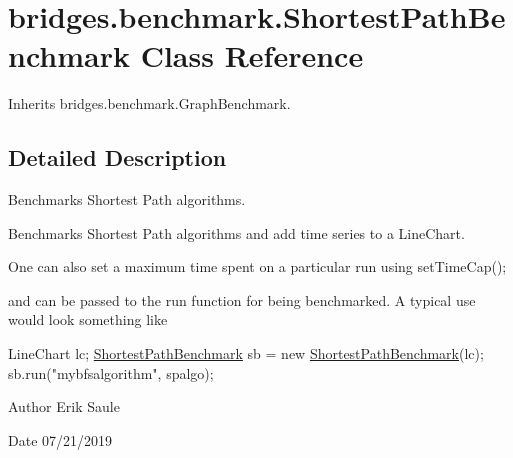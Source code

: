 \hypertarget{classbridges_1_1benchmark_1_1_shortest_path_benchmark}{}\section{bridges.\+benchmark.\+Shortest\+Path\+Benchmark Class Reference}
\label{classbridges_1_1benchmark_1_1_shortest_path_benchmark}


Inherits bridges.\+benchmark.\+Graph\+Benchmark.



\subsection{Detailed Description}
Benchmarks Shortest Path algorithms. 

Benchmarks Shortest Path algorithms and add time series to a Line\+Chart.

One can also set a maximum time spent on a particular run using set\+Time\+Cap();

and can be passed to the run function for being benchmarked. A typical use would look something like


\begin{DoxyCode}
LineChart lc;
\mbox{\hyperlink{classbridges_1_1benchmark_1_1_shortest_path_benchmark_ad878c2ad9c6912170601092423c54c43}{ShortestPathBenchmark}} sb = \textcolor{keyword}{new} \mbox{\hyperlink{classbridges_1_1benchmark_1_1_shortest_path_benchmark_ad878c2ad9c6912170601092423c54c43}{ShortestPathBenchmark}}(lc);
sb.run(\textcolor{stringliteral}{"mybfsalgorithm"}, spalgo);
\end{DoxyCode}


\begin{DoxyAuthor}{Author}
Erik Saule 
\end{DoxyAuthor}
\begin{DoxyDate}{Date}
07/21/2019 
\end{DoxyDate}
